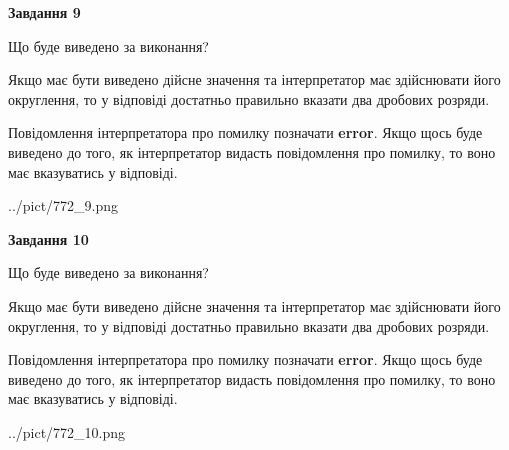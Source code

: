 \documentclass[12pt, ukrainian]{article}
\begin{document}
{\begin {Large}
{\begin {center}\textbf{Завдання 9}\end {center}}\par
Що буде виведено за виконання? \par

Якщо має бути виведено дійсне значення та інтерпретатор має здійснювати його округлення, 
то у відповіді достатньо правильно вказати два дробових розряди.

Повідомлення інтерпретатора про помилку позначати \textbf{error}.
Якщо щось буде виведено до того, як інтерпретатор видасть повідомлення про помилку, 
то воно має вказуватись у відповіді. \par

\begin{center}
	{../pict/772_9.png}
\end{center}
\newpage

{\begin {center}\textbf{Завдання 10}\end {center}}\par
Що буде виведено за виконання? \par

Якщо має бути виведено дійсне значення та інтерпретатор має здійснювати його округлення, 
то у відповіді достатньо правильно вказати два дробових розряди.

Повідомлення інтерпретатора про помилку позначати \textbf{error}.
Якщо щось буде виведено до того, як інтерпретатор видасть повідомлення про помилку, 
то воно має вказуватись у відповіді. \par

\begin{center}
	{../pict/772_10.png}
\end{center}
\newpage

\end {Large}}
\end{document}

